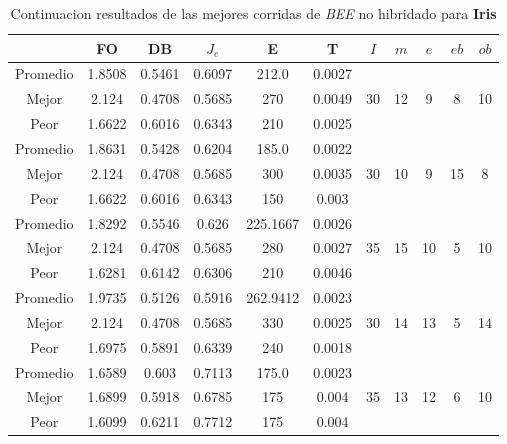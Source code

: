 \begin{table}[h!]
    \footnotesize
    \begin{center}
        \begin{tabular}{|c|c|c|c|c|c|c|c|c|c|c|}
        \hline
            & {\bf FO} & {\bf DB} & $J_e$ & {\bf E} & {\bf T} & $I$ & $m$ & $e$ & $eb$ & $ob$ \\
        \hline
        \hline
            Promedio  & 1.8508 & 0.5461 & 0.6097 & 212.0 & 0.0027 &  &  &  &  & \\
            \cline{1-6}
            Mejor & 2.124 & 0.4708  & 0.5685 & 270 & 0.0049 & 30 & 12 & 9 & 8 & 10\\
            \cline{1-6}
            Peor & 1.6622 & 0.6016  & 0.6343 & 210 & 0.0025 &  &  &  &  & \\
        \hline
        \hline
            Promedio  & 1.8631 & 0.5428 & 0.6204 & 185.0 & 0.0022 &  &  &  &  & \\
            \cline{1-6}
            Mejor & 2.124 & 0.4708  & 0.5685 & 300 & 0.0035 & 30 & 10 & 9 & 15 & 8\\
            \cline{1-6}
            Peor & 1.6622 & 0.6016  & 0.6343 & 150 & 0.003 &  &  &  &  & \\
        \hline
        \hline
            Promedio  & 1.8292 & 0.5546 & 0.626 & 225.1667 & 0.0026 &  &  &  &  & \\
            \cline{1-6}
            Mejor & 2.124 & 0.4708  & 0.5685 & 280 & 0.0027 & 35 & 15 & 10 & 5 & 10\\
            \cline{1-6}
            Peor & 1.6281 & 0.6142  & 0.6306 & 210 & 0.0046 &  &  &  &  & \\
        \hline
        \hline
            Promedio  & 1.9735 & 0.5126 & 0.5916 & 262.9412 & 0.0023 &  &  &  &  & \\
            \cline{1-6}
            Mejor & 2.124 & 0.4708  & 0.5685 & 330 & 0.0025 & 30 & 14 & 13 & 5 & 14\\
            \cline{1-6}
            Peor & 1.6975 & 0.5891  & 0.6339 & 240 & 0.0018 &  &  &  &  & \\
        \hline
        \hline
            Promedio  & 1.6589 & 0.603 & 0.7113 & 175.0 & 0.0023 &  &  &  &  & \\
            \cline{1-6}
            Mejor & 1.6899 & 0.5918  & 0.6785 & 175 & 0.004 & 35 & 13 & 12 & 6 & 10\\
            \cline{1-6}
            Peor & 1.6099 & 0.6211  & 0.7712 & 175 & 0.004 &  &  &  &  & \\
        \hline
        \end{tabular}
        \caption{Continuacion resultados de las mejores corridas de \emph{BEE} no hibridado para {\bf Iris}}
        \label{tb:tablebeealgcsv}
    \end{center}
\end{table}

